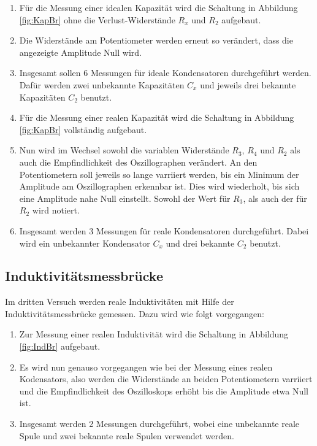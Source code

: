 \begin{enumerate}

\item Für die Messung einer idealen Kapazität wird die Schaltung in Abbildung
\ref{fig:KapBr} ohne die Verlust-Widerstände $R_x$ und $R_2$ aufgebaut.

\item Die Widerstände am Potentiometer werden erneut so verändert, dass die
angezeigte Amplitude Null wird.

\item Insgesamt sollen 6 Messungen für ideale Kondensatoren durchgeführt werden.
Dafür werden zwei unbekannte Kapazitäten $C_x$ und jeweils drei
bekannte Kapazitäten $C_2$ benutzt.

\item Für die Messung einer realen Kapazität wird die Schaltung in Abbildung
\ref{fig:KapBr} vollständig aufgebaut.

\item Nun wird im Wechsel sowohl die variablen Widerstände $R_3$, $R_4$
und $R_2$ als auch die Empfindlichkeit des Oszillographen verändert.
An den Potentiometern soll jeweils so lange varriiert werden, bis ein Minimum
der Amplitude am Oszillographen erkennbar ist. Dies wird wiederholt,
bis sich eine Amplitude nahe Null einstellt.
Sowohl der Wert für $R_3$, als auch der für $R_2$ wird notiert.

\item Insgesamt werden 3 Messungen für reale Kondensatoren durchgeführt. Dabei
wird ein unbekannter Kondensator $C_x$ und drei bekannte $C_2$ benutzt.

\end{enumerate}


\subsection{Induktivitätsmessbrücke}

Im dritten Versuch werden reale Induktivitäten mit Hilfe
der Induktivitätsmessbrücke gemessen. Dazu wird wie folgt vorgegangen:

\begin{enumerate}

\item Zur Messung einer realen Induktivität wird die Schaltung in Abbildung
\ref{fig:IndBr} aufgebaut.

\item Es wird nun genauso vorgegangen wie bei der Messung eines realen
Kodensators, also werden die Widerstände an beiden Potentiometern varriiert und
die Empfindlichkeit des Oszilloskops erhöht bis die Amplitude etwa Null ist.

\item Insgesamt werden 2 Messungen durchgeführt, wobei eine unbekannte reale
Spule und zwei bekannte reale Spulen verwendet werden.

\end{enumerate}


